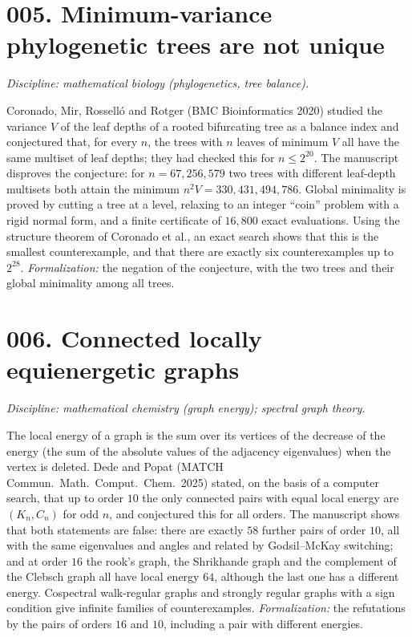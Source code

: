 \documentclass[11pt]{amsart}
\begin{document}
\section*{005. Minimum-variance phylogenetic trees are not unique}
\emph{Discipline: mathematical biology (phylogenetics, tree balance).}

Coronado, Mir, Rossell\'o and Rotger (BMC Bioinformatics 2020) studied the variance $V$ of the leaf depths of a rooted bifurcating tree as a balance index and conjectured that, for every $n$, the trees with $n$ leaves of minimum $V$ all have the same multiset of leaf depths; they had checked this for $n\le2^{20}$.
The manuscript disproves the conjecture: for $n=67{,}256{,}579$ two trees with different leaf-depth multisets both attain the minimum $n^2V=330{,}431{,}494{,}786$.
Global minimality is proved by cutting a tree at a level, relaxing to an integer ``coin'' problem with a rigid normal form, and a finite certificate of $16{,}800$ exact evaluations.
Using the structure theorem of Coronado et al., an exact search shows that this is the smallest counterexample, and that there are exactly six counterexamples up to $2^{28}$.
\emph{Formalization:} the negation of the conjecture, with the two trees and their global minimality among all trees.

\section*{006. Connected locally equienergetic graphs}
\emph{Discipline: mathematical chemistry (graph energy); spectral graph theory.}

The local energy of a graph is the sum over its vertices of the decrease of the energy (the sum of the absolute values of the adjacency eigenvalues) when the vertex is deleted.
Dede and Popat (MATCH Commun.\ Math.\ Comput.\ Chem.\ 2025) stated, on the basis of a computer search, that up to order $10$ the only connected pairs with equal local energy are $(K_n,C_n)$ for odd $n$, and conjectured this for all orders.
The manuscript shows that both statements are false: there are exactly $58$ further pairs of order $10$, all with the same eigenvalues and angles and related by Godsil--McKay switching; and at order $16$ the rook's graph, the Shrikhande graph and the complement of the Clebsch graph all have local energy $64$, although the last one has a different energy.
Cospectral walk-regular graphs and strongly regular graphs with a sign condition give infinite families of counterexamples.
\emph{Formalization:} the refutations by the pairs of orders $16$ and $10$, including a pair with different energies.
\end{document}
